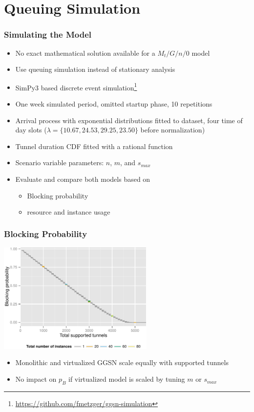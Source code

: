 \documentclass{beamer}
\begin{document}
\section{Queuing Simulation}


\begin{frame}
	\frametitle{Simulating the Model}

	\begin{itemize}
		\item No exact mathematical solution available for a $M_t/G/n/0$ model
		\item Use queuing simulation instead of stationary analysis
		\item SimPy3 based discrete event simulation\footnote{\url{https://github.com/fmetzger/ggsn-simulation}}
		\item One week simulated period, omitted startup phase, 10 repetitions
		\item Arrival process with exponential distributions fitted to dataset, four time of day slots ($\lambda=\{10.67,24.53,29.25,23.50\}$ before normalization)
		\item Tunnel duration CDF fitted with a rational function
		\item Scenario variable parameters: $n$, $m$, and $s_{max}$
		\item Evaluate and compare both models based on
		\begin{itemize}
			\item Blocking probability
			\item resource and instance usage
		\end{itemize}
	\end{itemize}

\end{frame}

\begin{frame}
	\frametitle{Blocking Probability}

	\begin{center}
		\includegraphics[height=5.5cm]{figures/virtual-blocking.pdf}
	\end{center}

	\begin{itemize}
		\item Monolithic and virtualized GGSN scale equally with supported tunnels
		\item No impact on $p_B$ if virtualized model is scaled by tuning $m$ or $s_{max}$
	\end{itemize}
\end{frame}
\end{document}
